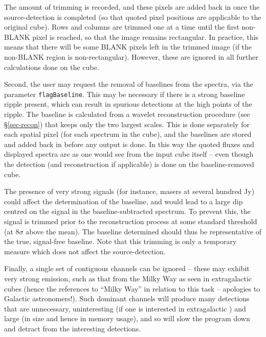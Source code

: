 The amount of trimming is recorded, and these pixels are added back in
once the source-detection is completed (so that quoted pixel positions
are applicable to the original cube). Rows and columns are trimmed one
at a time until the first non-BLANK pixel is reached, so that the
image remains rectangular. In practice, this means that there will be
some BLANK pixels left in the trimmed image (if the non-BLANK region
is non-rectangular). However, these are ignored in all further
calculations done on the cube.


Second, the user may request the removal of baselines from the
spectra, via the parameter \texttt{flagBaseline}. This may be
necessary if there is a strong baseline ripple present, which can
result in spurious detections at the high points of the ripple. The
baseline is calculated from a wavelet reconstruction procedure (see
\S\ref{sec-recon}) that keeps only the two largest scales. This is
done separately for each spatial pixel (\ie for each spectrum in the
cube), and the baselines are stored and added back in before any
output is done. In this way the quoted fluxes and displayed spectra
are as one would see from the input cube itself -- even though the
detection (and reconstruction if applicable) is done on the
baseline-removed cube.

The presence of very strong signals (for instance, masers at several
hundred Jy) could affect the determination of the baseline, and would
lead to a large dip centred on the signal in the baseline-subtracted
spectrum. To prevent this, the signal is trimmed prior to the
reconstruction process at some standard threshold (at $8\sigma$ above
the mean). The baseline determined should thus be representative of
the true, signal-free baseline. Note that this trimming is only a
temporary measure which does not affect the source-detection.

\label{sec-MW}

Finally, a single set of contiguous channels can be ignored -- these
may exhibit very strong emission, such as that from the Milky Way as
seen in extragalactic \hi cubes (hence the references to ``Milky
Way'' in relation to this task -- apologies to Galactic
astronomers!). Such dominant channels will produce many detections
that are unnecessary, uninteresting (if one is interested in
extragalactic \hi) and large (in size and hence in memory usage), and
so will slow the program down and detract from the interesting
detections. 

